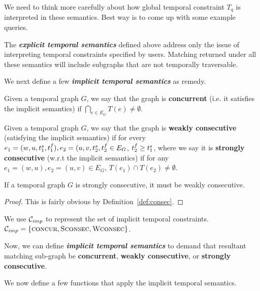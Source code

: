  We need to think more carefully about how global temporal
constraint $T_q$ is interpreted in these semantics. Best way is to come up with
some example queries.

\SmallSpace

The {\bf {\em explicit temporal semantics}} defined above address only the issue
of interpreting temporal constraints specified by users. Matching returned under
all these semantics will include subgraphs that are not temporally traversable.

We next define a few {\bf {\em implicit temporal semantics}} as remedy. 

\begin{defn}
  \label{def:concur}
  Given a temporal graph $G$, we say that the graph is {\bf concurrent} (i.e. it
  satisfies the \concurrent{} implicit semantics) if $\displaystyle\bigcap_{e
    \in E_G} T(e) \neq \emptyset$.
\end{defn}

\begin{defn}
  \label{def:consec}  
  Given a temporal graph $G$, we say that the graph is \textbf{weakly
    consecutive} (satisfying the \weakConsec{} implicit semantics) if for every
  $e_1 = (w,u, t^s_1 , t^f_1), e_2 = (u,v, t^s_2, t^f_2 \in E_G$, $t^f_2 \geq
  t^s_1$, where we say it is {\bf strongly consecutive} (w.r.t the
  \strongConsec{} implicit semantics) if for any $e_1 = (w,u), e_2=(u,v) \in
  E_G$, $T(e_1) \cap T(e_2) \neq \emptyset$.
\end{defn}

\begin{corollary}
If a temporal graph $G$ is strongly consecutive, it must be weakly consecutive.
\end{corollary}
\begin{proof}
  This is fairly obvious by Definition~\ref{def:consec}.
\end{proof}

We use $\mathcal{C}_{imp}$ to represent the set of implicit temporal constraints. $\mathcal{C}_{imp} =
\{\textsc{concur}, \textsc{Sconsec}, \textsc{Wconsec}\}$.

Now, we can define {\bf {\em implicit temporal semantics}} to demand that
resultant matching sub-graph be \textbf{concurrent}, \textbf{weakly
  consecutive}, or \textbf{strongly consecutive}.

We now define a few functions that apply the implicit temporal semantics. 

